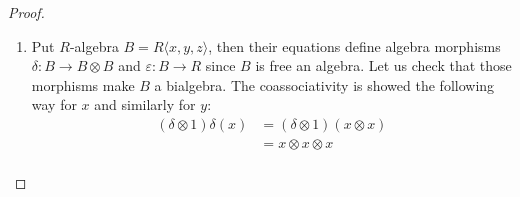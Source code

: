 \documentclass[8pt]{article}
\theoremstyle{definition}
\theoremstyle{definition}
\theoremstyle{definition}
\theoremstyle{definition}
\theoremstyle{definition}
\theoremstyle{definition}
\theoremstyle{definition}
\theoremstyle{definition}
\theoremstyle{definition}
\theoremstyle{definition}
\theoremstyle{definition}
\theoremstyle{definition}
\theoremstyle{definition}
\theoremstyle{definition}
\theoremstyle{question}
\begin{document}
\begin{proof}
\begin{enumerate}
\[\begin{tikzcd}
    \end{tikzcd}
    \]
    And this commutes by coassociativity of $C$. But $\rho$ is also surjective, so the coassociativity diagram for $C/I$
    (the bottom one) also commutes. Similarly, we take the unitality diagram for $C/I$ and conclude its commutativity from the following one:
    \[
    \begin{tikzcd}
      C \ar[dd, "\delta"'] \ar[dddd, bend right=50, "1"'] \ar[rr, "\rho"] && C/I \ar[dddd, bend left=50, "1"] \ar[dd, "\delta"] \\
      \\
      C \otimes C \ar[dd, shift left, "\varepsilon \otimes 1"] \ar[rr, "\rho \otimes \rho"] \ar[dd, shift right, "1 \otimes \varepsilon"']  && C/I \otimes C/I \ar[dd, shift left, "\varepsilon \otimes 1"] \ar[dd, shift right, "1 \otimes \varepsilon"'] \\
      \\
      C \ar[rr, "\rho"] && C/I\\
    \end{tikzcd}
    \]
    Therefore $\varepsilon : C/I \to R$ is a counit and $C/I$ is a bialgebra. The rest is to check the bialgebra conditions, the most complicated one is
    the condition that $\delta$ commutes with multiplication:
    \[
    \begin{tikzcd}
      C/I \otimes C/I  \ar[rrrr, "\mu"] \ar[dd, "\delta \otimes \delta"'] &&&& C/I \ar[dd, "\delta"] \\
      \\
      C/I \otimes C/I \otimes C/I \otimes C/I \ar[rr, "1 \otimes \sigma \otimes 1"] && C/I \otimes C/I \otimes C/I \otimes C/I \ar[rr, "\mu \otimes \mu"'] && C/I \otimes C/I
    \end{tikzcd}
    \]
    To show that, one precomposes the above diagram with $\rho \otimes \rho : C \otimes C \to C/I \otimes C/I$ and use the corresponding condition on $C$ and the fact that $\rho \otimes \rho$ is surjective.
    \item Put $R$-algebra $B = R\langle x, y, z \rangle$, then their equations define algebra morphisms
    $\delta : B \to B \otimes B$ and $\varepsilon : B \to R$ since $B$ is free an algebra. Let us check that those
    morphisms make $B$ a bialgebra. The coassociativity is showed the following way for $x$ and similarly for $y$:
    \begin{align*}
      (\delta \otimes 1) \delta(x) &= (\delta \otimes 1)(x \otimes x) \\
      &= x \otimes x \otimes x \\

\end{align*}
\end{enumerate}
\end{proof}
\end{document}

